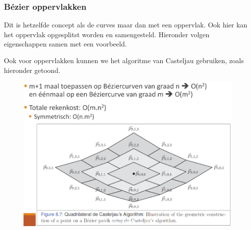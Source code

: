\documentclass[12pt,a4paper]{article}
\begin{document}
	\subsubsection*{Bézier oppervlakken}
	Dit is hetzelfde concept als de curves maar dan met een oppervlak. Ook hier kan het oppervlak opgesplitst worden en samengesteld. Hieronder volgen eigenschappen samen met een voorbeeld. 
	\begin{figure}[H]
		\centering
		\label{fig:oppervlakken-eigenschappen}
	\end{figure}
	
	Ook voor oppervlakken kunnen we het algoritme van Casteljau gebruiken, zoals hieronder getoond. 
	\begin{figure}[H]
		\centering
		\includegraphics[width=0.8\linewidth]{afbeeldingen/Beziercurven/casteljau-oppervlakken}
		\label{fig:casteljau-oppervlakken}
	\end{figure}
	
\end{document}
